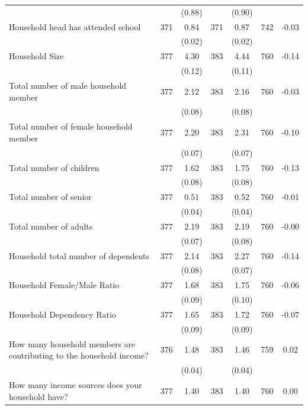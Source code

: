 \begin{tabular}{@{\extracolsep{5pt}}lcccccc}
 &   & (0.88)  &   & (0.90)  &   &  \\ [1ex]
Household head has attended school   & 371    & 0.84    & 371    & 0.87    & 742    & -0.03   \\
 &   & (0.02)  &   & (0.02)  &   &  \\ [1ex]
Household Size   & 377    & 4.30    & 383    & 4.44    & 760    & -0.14   \\
 &   & (0.12)  &   & (0.11)  &   &  \\ [1ex]
Total number of male household member   & 377    & 2.12    & 383    & 2.16    & 760    & -0.03   \\
 &   & (0.08)  &   & (0.08)  &   &  \\ [1ex]
Total number of female household member   & 377    & 2.20    & 383    & 2.31    & 760    & -0.10   \\
 &   & (0.07)  &   & (0.07)  &   &  \\ [1ex]
Total number of children   & 377    & 1.62    & 383    & 1.75    & 760    & -0.13   \\
 &   & (0.08)  &   & (0.08)  &   &  \\ [1ex]
Total number of senior   & 377    & 0.51    & 383    & 0.52    & 760    & -0.01   \\
 &   & (0.04)  &   & (0.04)  &   &  \\ [1ex]
Total number of adults   & 377    & 2.19    & 383    & 2.19    & 760    & -0.00   \\
 &   & (0.07)  &   & (0.08)  &   &  \\ [1ex]
Household total number of dependents   & 377    & 2.14    & 383    & 2.27    & 760    & -0.14   \\
 &   & (0.08)  &   & (0.07)  &   &  \\ [1ex]
Household Female/Male Ratio   & 377    & 1.68    & 383    & 1.75    & 760    & -0.06   \\
 &   & (0.09)  &   & (0.10)  &   &  \\ [1ex]
Household Dependency Ratio   & 377    & 1.65    & 383    & 1.72    & 760    & -0.07   \\
 &   & (0.09)  &   & (0.09)  &   &  \\ [1ex]
How many household members are contributing to the household income?   & 376    & 1.48    & 383    & 1.46    & 759    & 0.02   \\
 &   & (0.04)  &   & (0.04)  &   &  \\ [1ex]
How many income sources does your household have?   & 377    & 1.40    & 383    & 1.40    & 760    & 0.00   \\

\end{tabular}
